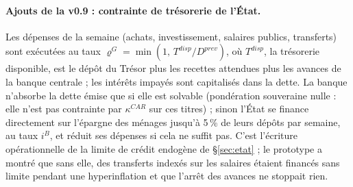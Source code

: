 \documentclass[11pt,a4paper]{article}
\begin{document}
\paragraph{Ajouts de la v0.9 : contrainte de trésorerie de l'État.} Les dépenses de la semaine (achats, investissement, salaires publics, transferts) sont exécutées au taux $\varrho^G=\min(1,\,T^{disp}/D^{prev})$, où $T^{disp}$, la trésorerie disponible, est le dépôt du Trésor plus les recettes attendues plus les avances de la banque centrale ; les intérêts impayés sont capitalisés dans la dette. La banque n'absorbe la dette émise que si elle est solvable (pondération souveraine nulle : elle n'est pas contrainte par $\kappa^{CAR}$ sur ces titres) ; sinon l'État se finance directement sur l'épargne des ménages jusqu'à 5\,\% de leurs dépôts par semaine, au taux $i^B$, et réduit ses dépenses si cela ne suffit pas. C'est l'écriture opérationnelle de la limite de crédit endogène de \S\ref{sec:etat} ; le prototype a montré que sans elle, des transferts indexés sur les salaires étaient financés sans limite pendant une hyperinflation et que l'arrêt des avances ne stoppait rien.
\end{document}

